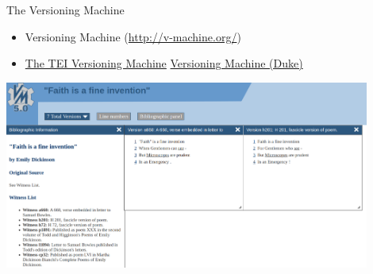 \begin{frame}{The Versioning Machine}

\begin{itemize}\small
    \item Versioning Machine (\protect\url{http://v-machine.org/})
    \item \href{https://tei-c.org/activities/projects/the-versioning-machine}{The TEI Versioning Machine}
    \href{https://digitalhumanities.duke.edu/tools/versioning-machine}{Versioning Machine (Duke)}
\end{itemize}

\includegraphics[width=0.9\textwidth]{img/tei-versioning-machine.png}

\end{frame}


